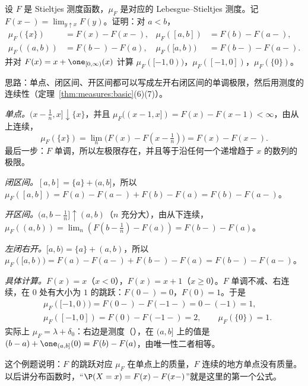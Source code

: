 \begin{workedexample}\label{we:extension:atoms}
设 $F$ 是 Stieltjes 测度函数，$\mu_F$ 是对应的 Lebesgue--Stieltjes 测度。记 $F(x-)=\lim_{y\uparrow x}F(y)$。证明：对 $a<b$，
\[
\begin{aligned}
\mu_F(\{x\})&=F(x)-F(x-),&\mu_F([a,b])&=F(b)-F(a-),\\
\mu_F((a,b))&=F(b-)-F(a),&\mu_F([a,b))&=F(b-)-F(a-).
\end{aligned}
\]
并对 $F(x)=x+\one_{[0,\infty)}(x)$ 计算 $\mu_F([-1,0))$，$\mu_F([-1,0])$，$\mu_F(\{0\})$。
\end{workedexample}
\begin{solution}
思路：单点、闭区间、开区间都可以写成左开右闭区间的单调极限，然后用测度的连续性（定理~\ref{thm:measures:basic}(6)(7)）。

\emph{单点。}$(x-\frac1n,x]\downarrow\{x\}$，并且 $\mu_F((x-1,x])=F(x)-F(x-1)<\infty$，由从上连续，
\[
\mu_F(\{x\})=\lim_n\bigl(F(x)-F(x-\tfrac1n)\bigr)=F(x)-F(x-).
\]
最后一步：$F$ 单调，所以左极限存在，并且等于沿任何一个递增趋于 $x$ 的数列的极限。

\emph{闭区间。}$[a,b]=\{a\}+(a,b]$，所以 $\mu_F([a,b])=F(a)-F(a-)+F(b)-F(a)=F(b)-F(a-)$。

\emph{开区间。}$(a,b-\frac1n]\uparrow(a,b)$（$n$ 充分大），由从下连续，$\mu_F((a,b))=\lim_n(F(b-\frac1n)-F(a))=F(b-)-F(a)$。

\emph{左闭右开。}$[a,b)=\{a\}+(a,b)$，所以 $\mu_F([a,b))=F(a)-F(a-)+F(b-)-F(a)=F(b-)-F(a-)$。

\emph{具体计算。}$F(x)=x$（$x<0$），$F(x)=x+1$（$x\geqslant0$）。$F$ 单调不减、右连续，在 $0$ 处有大小为 $1$ 的跳跃：$F(0-)=0$，$F(0)=1$。于是
\[
\begin{aligned}
&\mu_F([-1,0))=F(0-)-F(-1-)=0-(-1)=1,\\
&\mu_F([-1,0])=F(0)-F(-1-)=2,\qquad\mu_F(\{0\})=1.
\end{aligned}
\]
实际上 $\mu_F=\lambda+\delta_0$：右边是测度（），在 $(a,b]$ 上的值是 $(b-a)+\one_{(a,b]}(0)=F(b)-F(a)$，由唯一性二者相等。

这个例题说明：$F$ 的跳跃对应 $\mu_F$ 在单点上的质量，$F$ 连续的地方单点没有质量。以后讲分布函数时，“$\P(X=x)=F(x)-F(x-)$”就是这里的第一个公式。
\end{solution}

